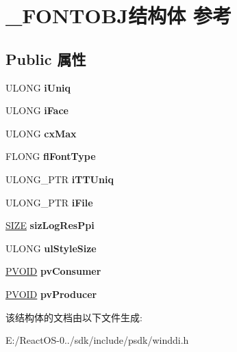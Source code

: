 \hypertarget{struct___f_o_n_t_o_b_j}{}\section{\+\_\+\+F\+O\+N\+T\+O\+B\+J结构体 参考}
\label{struct___f_o_n_t_o_b_j}
\subsection*{Public 属性}
\begin{DoxyCompactItemize}
\item 
\mbox{\label{struct___f_o_n_t_o_b_j_ada771f3dbaf7167db3800d21d63d15ba}} 
U\+L\+O\+NG {\bfseries i\+Uniq}
\item 
\mbox{\label{struct___f_o_n_t_o_b_j_a2bd2ec98517c7966ff41b9bc5bdcf6c4}} 
U\+L\+O\+NG {\bfseries i\+Face}
\item 
\mbox{\label{struct___f_o_n_t_o_b_j_a2c2271887178d608f90efd71b80b0a95}} 
U\+L\+O\+NG {\bfseries cx\+Max}
\item 
\mbox{\label{struct___f_o_n_t_o_b_j_ae554b4a1d4db53a2cd82f17262fa9b1f}} 
F\+L\+O\+NG {\bfseries fl\+Font\+Type}
\item 
\mbox{\label{struct___f_o_n_t_o_b_j_a7a2c3db88313d7169b3e225353e87673}} 
U\+L\+O\+N\+G\+\_\+\+P\+TR {\bfseries i\+T\+T\+Uniq}
\item 
\mbox{\label{struct___f_o_n_t_o_b_j_ae6261bb657479d91f812171cf4ba4f9d}} 
U\+L\+O\+N\+G\+\_\+\+P\+TR {\bfseries i\+File}
\item 
\mbox{\label{struct___f_o_n_t_o_b_j_a4365072cccfabf38581f37de09bc3bff}} 
\hyperlink{structtag_s_i_z_e}{S\+I\+ZE} {\bfseries siz\+Log\+Res\+Ppi}
\item 
\mbox{\label{struct___f_o_n_t_o_b_j_a99b5f65eb275dd1157855f6995c0a9e6}} 
U\+L\+O\+NG {\bfseries ul\+Style\+Size}
\item 
\mbox{\label{struct___f_o_n_t_o_b_j_a786960325513d63a88138b462ec8770a}} 
\hyperlink{interfacevoid}{P\+V\+O\+ID} {\bfseries pv\+Consumer}
\item 
\mbox{\label{struct___f_o_n_t_o_b_j_ac54b1d6dc8c1f0f4c89b328bd7a8ac4b}} 
\hyperlink{interfacevoid}{P\+V\+O\+ID} {\bfseries pv\+Producer}
\end{DoxyCompactItemize}


该结构体的文档由以下文件生成\+:\begin{DoxyCompactItemize}
\item 
E\+:/\+React\+O\+S-\/0../sdk/include/psdk/winddi.\+h\end{DoxyCompactItemize}
